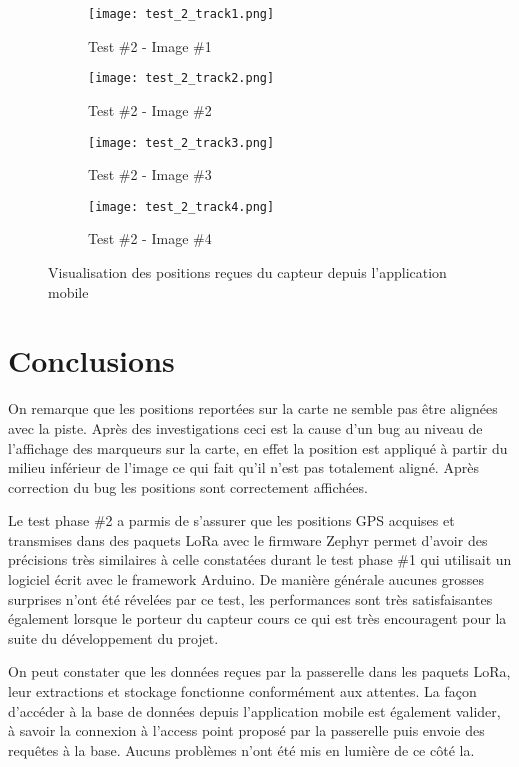 \begin{figure}[htb]
\centering
\begin{subfigure}{.5\textwidth}
  \centering
  \texttt{[image: test\_2\_track1.png]}
  \caption{Test \#2 - Image \#1}
  \label{fig:test_2_track1}
\end{subfigure}%
\begin{subfigure}{.5\textwidth}
  \centering
  \texttt{[image: test\_2\_track2.png]}
  \caption{Test \#2 - Image \#2}
  \label{fig:test_2_track2}
\end{subfigure}
\begin{subfigure}{.5\textwidth}
  \centering
  \texttt{[image: test\_2\_track3.png]}
  \caption{Test \#2 - Image \#3}
  \label{fig:test_2_track3}
\end{subfigure}%
\begin{subfigure}{.5\textwidth}
  \centering
  \texttt{[image: test\_2\_track4.png]}
  \caption{Test \#2 - Image \#4}
  \label{fig:test_2_track4}
\end{subfigure}
\caption{Visualisation des positions reçues du capteur depuis l'application mobile}
\label{fig:test_2}
\end{figure}

\section{Conclusions}

On remarque que les positions reportées sur la carte ne semble pas être alignées avec la piste. Après des investigations ceci est la cause d'un bug au niveau de l'affichage des marqueurs sur la carte, en effet la position est appliqué à partir du milieu inférieur de l'image ce qui fait qu'il n'est pas totalement aligné. Après correction du bug les positions sont correctement affichées.

Le test phase \#2 a parmis de s'assurer que les positions GPS acquises et transmises dans des paquets LoRa avec le firmware Zephyr permet d'avoir des précisions très similaires à celle constatées durant le test phase \#1 qui utilisait un logiciel écrit avec le framework Arduino. De manière générale aucunes grosses surprises n'ont été révelées par ce test, les performances sont très satisfaisantes également lorsque le porteur du capteur cours ce qui est très encouragent pour la suite du développement du projet.

On peut constater que les données reçues par la passerelle dans les paquets LoRa, leur extractions et stockage fonctionne conformément aux attentes. La façon d'accéder à la base de données depuis l'application mobile est également valider, à savoir la connexion à l'access point proposé par la passerelle puis envoie des requêtes à la base. Aucuns problèmes n'ont été mis en lumière de ce côté la.


